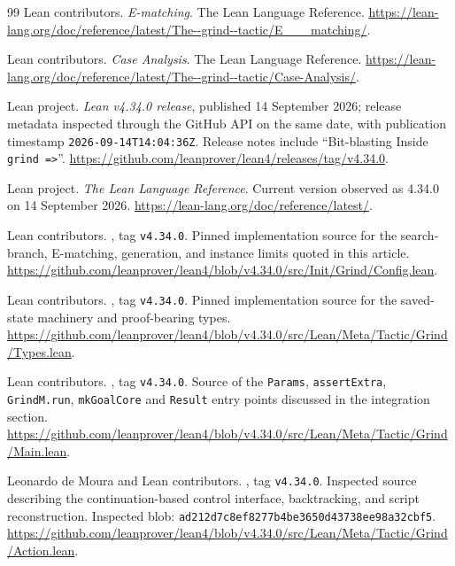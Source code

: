 \begin{thebibliography}{99}
Lean contributors. \emph{E-matching}. The Lean Language Reference.
\url{https://lean-lang.org/doc/reference/latest/The--grind--tactic/E___matching/}.

Lean contributors. \emph{Case Analysis}. The Lean Language Reference.
\url{https://lean-lang.org/doc/reference/latest/The--grind--tactic/Case-Analysis/}.


Lean project. \emph{Lean v4.34.0 release}, published 14 September 2026;
release metadata inspected through the GitHub API on the same date, with
publication timestamp \texttt{2026-09-14T14:04:36Z}. Release notes include
``Bit-blasting Inside \texttt{grind =>}''.
\url{https://github.com/leanprover/lean4/releases/tag/v4.34.0}.

Lean project. \emph{The Lean Language Reference}. Current version observed as
4.34.0 on 14 September 2026.
\url{https://lean-lang.org/doc/reference/latest/}.

Lean contributors. , tag \texttt{v4.34.0}.
Pinned implementation source for the search-branch, E-matching, generation,
and instance limits quoted in this article.
\url{https://github.com/leanprover/lean4/blob/v4.34.0/src/Init/Grind/Config.lean}.

Lean contributors. , tag
\texttt{v4.34.0}. Pinned implementation source for the saved-state machinery
and proof-bearing types.
\url{https://github.com/leanprover/lean4/blob/v4.34.0/src/Lean/Meta/Tactic/Grind/Types.lean}.

Lean contributors. , tag
\texttt{v4.34.0}. Source of the \texttt{Params}, \texttt{assertExtra},
\texttt{GrindM.run}, \texttt{mkGoalCore} and \texttt{Result} entry points
discussed in the integration section.
\url{https://github.com/leanprover/lean4/blob/v4.34.0/src/Lean/Meta/Tactic/Grind/Main.lean}.

Leonardo de Moura and Lean contributors.
, tag \texttt{v4.34.0}.
Inspected source describing the continuation-based control interface,
backtracking, and script reconstruction. Inspected blob:
\texttt{ad212d7c8ef8277b4be3650d43738ee98a32cbf5}.
\url{https://github.com/leanprover/lean4/blob/v4.34.0/src/Lean/Meta/Tactic/Grind/Action.lean}.


\end{thebibliography}

